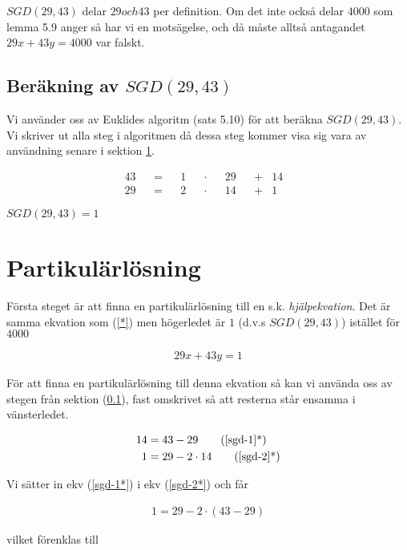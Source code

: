 \documentclass{article}
\begin{document}
$SGD(29, 43)$ delar $29 och 43$ per definition. Om det inte också delar $4000$ som lemma 5.9 anger så har vi en motsägelse, och då måste alltså antagandet $29x + 43y = 4000$ var falskt.

\subsection{Beräkning av $SGD(29, 43)$}\label{berakning_av_sgd}

Vi använder oss av Euklides algoritm (sats 5.10) för att beräkna $SGD(29, 43)$. Vi skriver ut alla steg i algoritmen då dessa steg kommer visa sig vara av användning senare i sektion \ref{partikularlosning}.

\begin{align}
  &43& &=& &1& &\cdot& &29& &+& 14&& \label{sgd-1} \\
  &29& &=& &2& &\cdot& &14& &+& 1 && \label{sgd-2}
\end{align}

\centerline{$SGD(29, 43) = 1$}

\section{Partikulärlösning}\label{partikularlosning}

Första steget är att finna en partikulärlösning till en s.k. \emph{hjälpekvation}. Det är samma ekvation som (\ref{*}) men högerledet är $1$ (d.v.s $SGD(29, 43)$) istället för $4000$

\begin{gather*}
  29x + 43y = 1 \label{H}\tag{H}
\end{gather*}

För att finna en partikulärlösning till denna ekvation så kan vi använda oss av stegen från sektion (\ref{berakning_av_sgd}), fast omskrivet så att resterna står ensamma i vänsterledet.

\begin {align*}
  14 &= 43 - 29 \label{sgd-1*}\tag{\ref{sgd-1}*}\\
  1 &= 29 - 2 \cdot 14 \label{sgd-2*}\tag{\ref{sgd-2}*}
\end{align*}

Vi sätter in ekv (\ref{sgd-1*}) i ekv (\ref{sgd-2*}) och får

\begin{gather*}
  1 = 29 - 2 \cdot (43 - 29)
\end{gather*}

vilket förenklas till
\end{document}
